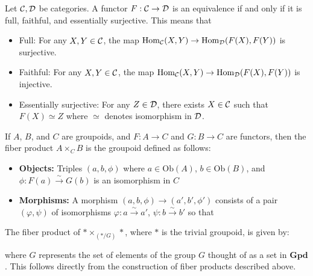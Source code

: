 \documentclass[12pt]{article}
\begin{document}
\begin{proposition}
    Let $\cal C, \cal D$ be categories. A functor $F: \cal C \to \cal D$ is an equivalence if and only if it is full, faithful, and essentially surjective. This means that \begin{itemize}
        \item Full: For any $X,Y \in \cal C$, the map $\operatorname{Hom}_{\cal C}(X,Y) \to \operatorname{Hom}_{\cal D}(F(X), F(Y))$ is surjective.
        \item Faithful: For any $X,Y \in \cal C$, the map $\operatorname{Hom}_{\cal C}(X,Y) \to \operatorname{Hom}_{\cal D}(F(X), F(Y))$ is injective.
        \item Essentially surjective: For any $Z \in \cal D$, there exists $X \in \cal C$ such that $F(X) \simeq Z$ where $\simeq$ denotes isomorphism in $\cal D$.
    \end{itemize}
\end{proposition}

\begin{definition}
    If $A$, $B$, and $C$ are groupoids, and $F : A \rightarrow C$ and $G : B \rightarrow C$ are functors, then the fiber product $A \times_C B$ is the groupoid defined as follows:

    \begin{itemize}
        \item \textbf{Objects:} Triples $(a, b, \phi)$ where $a \in \text{Ob}(A)$, $b \in \text{Ob}(B)$, and $\phi : F(a) \stackrel{\sim}{\rightarrow} G(b)$ is an isomorphism in $C$

        \item \textbf{Morphisms:} A morphism $(a, b, \phi) \rightarrow (a', b', \phi')$ consists of a pair $(\varphi, \psi)$ of isomorphisms $\varphi : a \stackrel{\sim}{\rightarrow} a'$, $\psi : b \stackrel{\sim}{\rightarrow} b'$ so that
              \begin{center}
              \end{center}
    \end{itemize}
\end{definition}

\begin{example}
    The fiber product of $* \times_{(*/G)} *$, where $*$ is the trivial groupoid, is given by:
    \begin{center}
    \end{center}
    where $G$ represents the set of elements of the group $G$ thought of as a set in $\textbf{Gpd}$. This follows directly from the construction of fiber products described above.
\end{example}
\end{document}
